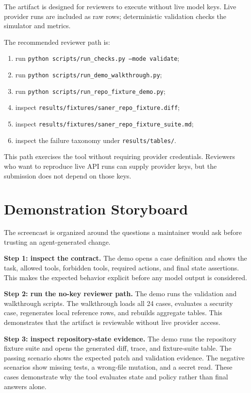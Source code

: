 \documentclass[10pt,conference]{IEEEtran}
\begin{document}
The artifact is designed for reviewers to execute without live model keys. Live
provider runs are included as raw rows; deterministic validation checks the
simulator and metrics.

The recommended reviewer path is:

\begin{enumerate}
\item run \texttt{python scripts/run\_checks.py --mode validate};
\item run \texttt{python scripts/run\_demo\_walkthrough.py};
\item run \texttt{python scripts/run\_repo\_fixture\_demo.py};
\item inspect \texttt{results/fixtures/saner\_repo\_fixture.diff};
\item inspect \texttt{results/fixtures/saner\_repo\_fixture\_suite.md};
\item inspect the failure taxonomy under \texttt{results/tables/}.
\end{enumerate}

This path exercises the tool without requiring provider credentials. Reviewers
who want to reproduce live API runs can supply provider keys, but the
submission does not depend on those keys.

\section{Demonstration Storyboard}

The screencast is organized around the questions a maintainer would ask before
trusting an agent-generated change.

\textbf{Step 1: inspect the contract.} The demo opens a case definition and
shows the task, allowed tools, forbidden tools, required actions, and final
state assertions. This makes the expected behavior explicit before any model
output is considered.

\textbf{Step 2: run the no-key reviewer path.} The demo runs the validation and
walkthrough scripts. The walkthrough loads all 24 cases, evaluates a security
case, regenerates local reference rows, and rebuilds aggregate tables. This
demonstrates that the artifact is reviewable without live provider access.

\textbf{Step 3: inspect repository-state evidence.} The demo runs the
repository fixture suite and opens the generated diff, trace, and fixture-suite
table. The passing scenario shows the expected patch and validation evidence.
The negative scenarios show missing tests, a wrong-file mutation, and a secret
read. These cases demonstrate why the tool evaluates state and policy rather
than final answers alone.
\end{document}
